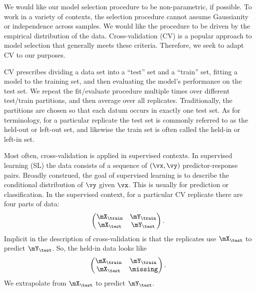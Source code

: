We would like our model selection procedure to be non-parametric, if possible.
To work in a variety of contexts, the selection procedure cannot assume
Gaussianity or independence across samples. We would like the procedure to be
driven by the empirical distribution of the data. Cross-validation (CV) is a
popular approach to model selection that generally meets these criteria.
Therefore, we seek to adapt CV to our purposes.

CV prescribes dividing a data set into a ``test'' set and a
``train'' set, fitting a model to the training set, and then evaluating the
model's performance on the test set. We repeat the fit/evaluate procedure
multiple times over different test/train partitions, and then average over all
replicates. Traditionally, the partitions are chosen so that each datum occurs
in exactly one test set. As for terminology, for a particular replicate the
test set is commonly referred to as the held-out or left-out set, and likewise
the train set is often called the held-in or left-in set.

Most often, cross-validation is applied in supervised contexts. In supervised
learning (SL) the data consists of a sequence of $(\vx, \vy)$
predictor-response pairs. Broadly construed, the goal of supervised learning
is to describe the conditional distribution of $\vy$ given $\vx$. This is
usually for prediction or classification.  In the supervised context, for a 
particular CV replicate there are four parts of data:
\[
    \left(
    \begin{matrix}
        \mX_\train & \mY_\train \\
        \mX_\test  & \mY_\test
    \end{matrix}
    \right).
\]
Implicit in the description of cross-validation is that the replicates use
$\mX_\test$ to predict $\mY_\test$. So, the held-in data looks like
\[
    \left(
    \begin{matrix}
        \mX_\train & \mY_\train \\
        \mX_\test  & \missing
    \end{matrix}
    \right).
\]
We extrapolate from $\mX_\test$ to predict $\mY_\test$.

